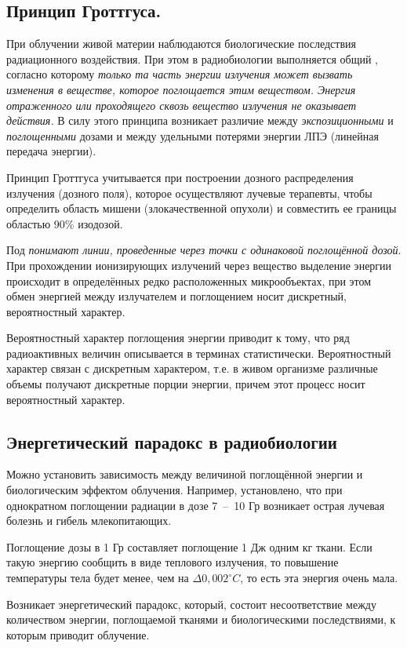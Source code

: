 \documentclass[a4paper, 14pt]{article}
\renewcommand{\emph}[1]{{\color{orange}{\textit{\textbf{#1}}}}}
\begin{document}
\subsection{Принцип Гроттгуса.}
При облучении живой материи наблюдаются биологические последствия
радиационного воздействия. При этом в радиобиологии выполняется общий \emph{принцип
Гроттгуса}, согласно которому \textit{только та часть энергии излучения может вызвать
изменения в веществе, которое поглощается этим веществом. Энергия отраженного
или проходящего сквозь вещество излучения не оказывает действия.} В силу этого
принципа возникает различие между \textit{экспозиционными} и \textit{поглощенными} дозами и
между удельными потерями энергии ЛПЭ (линейная передача энергии).

Принцип Гроттгуса учитывается при построении дозного распределения
излучения (дозного поля), которое осуществляют лучевые терапевты, чтобы
определить область мишени (злокачественной опухоли) и совместить ее границы
областью 90\% изодозой.

Под \emph{изодозой} \textit{понимают линии, проведенные через точки с одинаковой
поглощённой дозой}. При прохождении ионизирующих излучений через вещество
выделение энергии происходит в определённых редко расположенных микрообъектах,
при этом обмен энергией между излучателем и поглощением носит дискретный,
вероятностный характер.

Вероятностный характер поглощения энергии приводит к тому, что ряд
радиоактивных величин описывается в терминах статистически. Вероятностный
характер связан с дискретным характером, т.е. в живом организме различные объемы
получают дискретные порции энергии, причем этот процесс носит вероятностный
характер.

\subsection{Энергетический парадокс в радиобиологии}
Можно установить зависимость между величиной поглощённой энергии и
биологическим эффектом облучения. Например, установлено, что при однократном
поглощении радиации в дозе 7~--~10 Гр возникает острая лучевая болезнь и гибель
млекопитающих.

Поглощение дозы в 1 Гр составляет поглощение 1 Дж одним кг ткани. Если
такую энергию сообщить в виде теплового излучения, то повышение температуры
тела будет менее, чем на $\Delta0,002^\circ C$, то есть эта энергия очень мала.

Возникает энергетический парадокс, который, состоит несоответствие между
количеством энергии, поглощаемой тканями и биологическими последствиями, к
которым приводит облучение.
\end{document}
